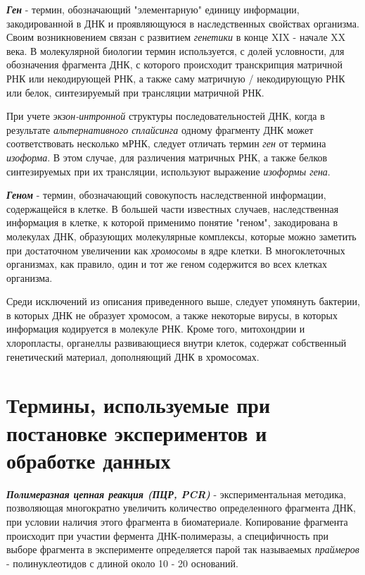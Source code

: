 \noindent
\textbf{ \textit{Ген} } - термин, обозначающий "элементарную" единицу информации, закодированной в ДНК и проявляющуюся в наследственных свойствах организма. Своим возникновением связан с развитием \textit{генетики} в конце XIX - начале XX века. В молекулярной биологии термин используется, с долей условности, для обозначения фрагмента ДНК, с которого происходит транскрипция матричной РНК или некодирующей РНК, а также саму матричную / некодирующую РНК или белок, синтезируемый при трансляции матричной РНК. 

При учете \textit{экзон-интронной} структуры последовательностей ДНК, когда в результате \textit{альтернативного сплайсинга} одному фрагменту ДНК может соответствовать несколько мРНК, следует отличать термин \textit{ген} от термина \textit{изоформа}. В этом случае, для различения матричных РНК, а также белков синтезируемых при их трансляции, используют выражение \textit{изоформы гена}.

\noindent
\textbf{ \textit{Геном} } - термин, обозначающий совокупость наследственной информации, содержащейся в клетке. В большей части известных случаев, наследственная информация в клетке, к которой применимо понятие "геном", закодирована в молекулах ДНК, образующих молекулярные комплексы, которые можно заметить при достаточном увеличении как \textit{хромосомы} в ядре клетки. В многоклеточных организмах, как правило, один и тот же геном содержится во всех клетках организма.

Среди исключений из описания приведенного выше, следует упомянуть бактерии, в которых ДНК не образует хромосом, а также некоторые вирусы, в которых информация кодируется в молекуле РНК. Кроме того, митохондрии и хлоропласты, органеллы развивающиеся внутри клеток, содержат собственный генетический материал, дополняющий ДНК в хромосомах.

\section{Термины, используемые при постановке экспериментов и обработке данных} \label{sect_molbio_terms}

\noindent
\textbf{ \textit{Полимеразная цепная реакция (ПЦР, PCR)} } - экспериментальная методика, позволяющая многократно увеличить количество определенного фрагмента ДНК, при условии наличия этого фрагмента в биоматериале. Копирование фрагмента происходит при участии фермента ДНК-полимеразы, а специфичность при выборе фрагмента в эксперименте определяется парой так называемых \textit{праймеров} - полинуклеотидов с длиной около 10 - 20 оснований. 

